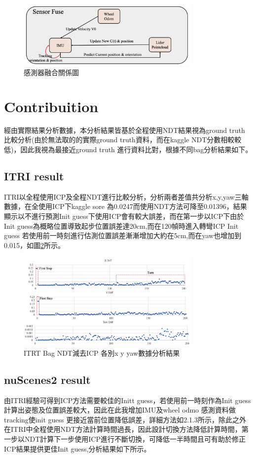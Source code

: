 \documentclass{article}
\begin{document}
\begin{figure}[H]
\centering
	\includegraphics[width=0.8\textwidth]{./fuse.png}
	\caption{感測器融合關係圖}
	\label{fig:fuse.png}
\end{figure}

\section{Contribuition}
經由實際結果分析數據，本分析結果皆基於全程使用NDT結果視為ground truth 比較分析(由於無法取的的實際ground truth資料，而在kaggle NDT分數相較較低)，因此我視為最接近ground truth 進行資料比對，根據不同bag分析結果如下。
\subsection{ITRI result}
ITRI以全程使用ICP及全程NDT進行比較分析，分析兩者差值共分析x,y,yaw三軸數據，在全使用ICP下kaggle sore 為0.0247而使用NDT方法可降至0.01396，結果顯示以不進行預測Init guess下使用ICP會有較大誤差，而在第一步以ICP下由於Init guess為概略位置導致起步位置誤差達20cm,而在120幀時進入轉彎ICP Init guess 若使用前一時刻進行估測位置誤差漸漸增加大約在5cm,而在yaw也增加到0.015，如圖\ref{fig:res1.png}所示。
\begin{figure}[H]
\centering
	\includegraphics[width=0.8\textwidth]{./ITRI_res.png}
	\caption{ITRT Bag NDT減去ICP 各別x y yaw數據分析結果}
	\label{fig:res1.png}
\end{figure}
\subsection{nuScenes2 result}
由ITRI經驗可得到ICP方法需要較佳的Initt guess，若使用前一時刻作為Init guess計算出姿態及位置誤差較大，因此在此我增加IMU及wheel odmo 感測資料做tracking使init guess 更接近當前位置降低誤差，詳細方法如2.1.3所示，除此之外在ITRI中全程使用NDT方法計算時間過長，因此設計切換方法降低計算時間，第一步以NDT計算下一步使用ICP進行不斷切換，可降低一半時間且可有助於修正ICP結果提供更佳Init guess,分析結果如下所示。
\end{document}
